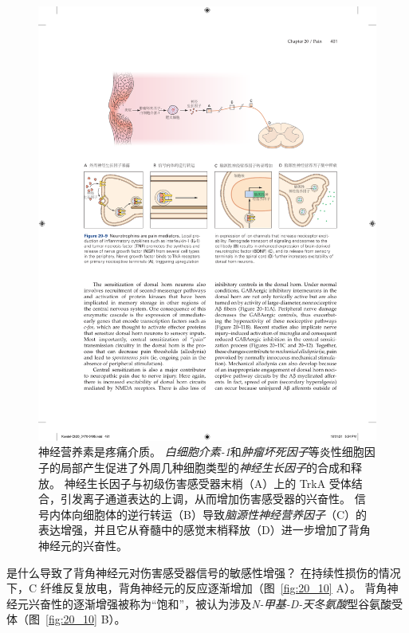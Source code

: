 \begin{figure}[htbp]
	\centering
	\includegraphics[width=1.0\linewidth]{chap20/fig_20_9}
	\caption{神经营养素是疼痛介质。
		\textit{白细胞介素-1}和\textit{肿瘤坏死因子}等炎性细胞因子的局部产生促进了外周几种细胞类型的\textit{神经生长因子}的合成和释放。
		神经生长因子与初级伤害感受器末梢（A）上的 TrkA 受体结合，引发离子通道表达的上调，从而增加伤害感受器的兴奋性。
		信号内体向细胞体的逆行转运（B）导致\textit{脑源性神经营养因子}（C）的表达增强，并且它从脊髓中的感觉末梢释放（D）进一步增加了背角神经元的兴奋性。}
	\label{fig:20_9}
\end{figure}


是什么导致了背角神经元对伤害感受器信号的敏感性增强？
在持续性损伤的情况下，C 纤维反复放电，背角神经元的反应逐渐增加（图~\ref{fig:20_10} A）。
背角神经元兴奋性的逐渐增强被称为“饱和”，被认为涉及\textit{N-甲基-D-天冬氨酸}型谷氨酸受体（图~\ref{fig:20_10} B）。


